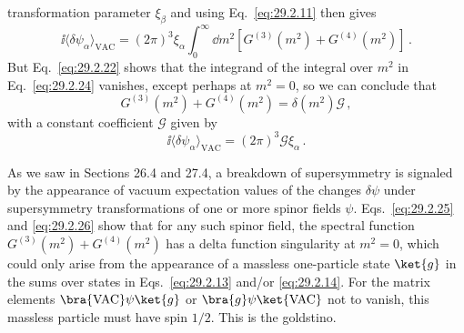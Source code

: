 transformation parameter \(\xi_\beta\) and using
Eq.~\eqref{eq:29.2.11} then gives
\begin{equation}
  \ii\langle\delta\psi_\alpha\rangle_{\mathrm{VAC}}
  =(2\pi)^3\xi_\alpha
  \int_0^\infty \dd m^2
  \left[G^{(3)}(m^2)+G^{(4)}(m^2)\right]\,.
  \tag{29.2.24}\label{eq:29.2.24}
\end{equation}
But Eq.~\eqref{eq:29.2.22} shows that the integrand of the integral over
\(m^2\) in Eq.~\eqref{eq:29.2.24} vanishes, except perhaps at \(m^2=0\),
so we can conclude that
\begin{equation}
  G^{(3)}(m^2)+G^{(4)}(m^2)
  =\delta(m^2)\mathcal{G}\,,
  \tag{29.2.25}\label{eq:29.2.25}
\end{equation}
with a constant coefficient \(\mathcal{G}\) given by
\begin{equation}
  \ii\langle\delta\psi_\alpha\rangle_{\mathrm{VAC}}
  =(2\pi)^3\mathcal{G}\xi_\alpha\,.
  \tag{29.2.26}\label{eq:29.2.26}
\end{equation}

As we saw in Sections 26.4 and 27.4, a breakdown of supersymmetry is
signaled by the appearance of vacuum expectation values of the changes
\(\delta\psi\) under supersymmetry transformations of one or more spinor
fields \(\psi\). Eqs.~\eqref{eq:29.2.25} and \eqref{eq:29.2.26} show that
for any such spinor field, the spectral function
\(G^{(3)}(m^2)+G^{(4)}(m^2)\) has a delta function singularity at
\(m^2=0\), which could only arise from the appearance of a massless
one-particle state \(\ket{g}\) in the sums over states in
Eqs.~\eqref{eq:29.2.13} and/or \eqref{eq:29.2.14}. For the matrix elements
\(\bra{\mathrm{VAC}}\psi\ket{g}\) or
\(\bra{g}\psi\ket{\mathrm{VAC}}\) not to vanish, this
massless particle must have spin \(1/2\). This is the goldstino.

